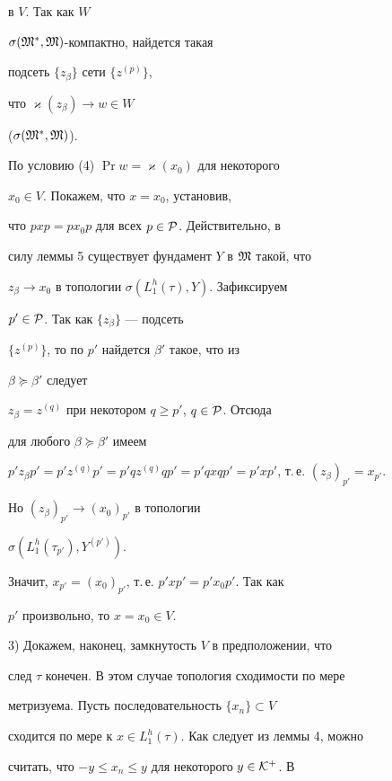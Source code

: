 \begin{pf}
в $V$. Так как $W$\;


$\sigma ({\frak M}^*, {\frak M})$-компактно, найдется такая


подсеть $\{z_{\beta}\}$ сети $\{z^{(p)}\}$, 


что $\varkappa (z_{\beta}) \to w \in W$ 


($\sigma ({\frak M}^*, {\frak M})$). 


По условию (4) $\Pr w=\varkappa (x_0)$ для некоторого 


$x_0 \in V$. Покажем, что $x=x_0$, установив, 


что $pxp=p x_0 p$ для всех $p \in {\cal P}$. Действительно, в 


силу леммы 5 существует фундамент $Y$ в $\frak M$ такой, что 


$z_{\beta} \to x_0$ в топологии $\sigma (L_1^h (\tau), Y)$. Зафиксируем


$p'\in {\cal P}$. Так как $\{z_{\beta}\}$ --- подсеть 


$\{z^{(p)}\}$, то по $p'$ найдется ${\beta}'$ такое, что из 


${\beta} \succeq {\beta}'$ следует 


$z_{\beta}=z^{(q)}$ при некотором $q \ge p'$, $q \in {\cal P}$. Отсюда 


для любого ${\beta} \succeq {\beta}'$ имеем 


$p' z_{\beta} p'=p' z^{(q)} p'=p' q z^{(q)} q p'=p'qxqp'=


p'xp'$, т.\,е. $(z_{\beta})_{p'}=x_{p'}$. 


Но $(z_{\beta})_{p'} \to (x_0)_{p'}$ в топологии 


$\sigma (L_1^h (\tau_{p'}), Y^{(p')})$.


Значит, $x_{p'}=(x_0)_{p'}$, т.\,е. $p'xp'=p' x_0 p'$. Так как 


$p'$ произвольно, то $x=x_0 \in V$. 


\smallskip





3) Докажем, наконец, замкнутость $V$ в предположении, что


след $\tau $ конечен. В этом случае топология сходимости по мере 


метризуема. Пусть последовательность $\{x_n\} \subset V$ 


сходится по мере к $x \in L_1^h (\tau)$. Как следует из леммы 4, можно 


считать, что $-y \le x_n \le y$ для некоторого $y \in {\cal K}^+$. В 



\end{pf}
